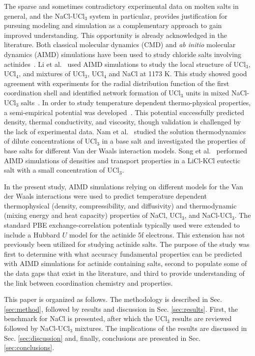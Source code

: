 \documentclass[preprint,3p,10pt,onecolumn,number,sort&compress]{elsarticle}
\begin{document}
The sparse and sometimes contradictory experimental data on molten salts in general, and the NaCl-UCl$_3$ system in particular, provides justification for pursuing modeling and simulation as a complementary approach to gain improved understanding. This opportunity is already acknowledged in the literature. Both classical molecular dynamics (CMD) and \textit{ab initio} molecular dynamics (AIMD) simulations have been used to study chloride salts involving actinides~\cite{Li,Li2020,Nam2015,SONG}. Li et al.~\cite{Li} used AIMD simulations to study the local structure of UCl$_3$, UCl$_4$, and mixtures of UCl$_3$, UCl$_4$ and NaCl at 1173 K. This study showed good agreement with experiments for the radial distribution function of the first coordination shell and identified network formation of UCl$_3$ units in mixed NaCl-UCl$_3$ salts~\cite{Li}. %
In order to study temperature dependent thermo-physical properties, a semi-empirical potential was developed~\cite{Li2020}. This potential successfully predicted density, thermal conductivity, and viscosity, though validation is challenged by the lack of experimental data. Nam et al.~\cite{Nam2015} studied the solution thermodynamics of dilute concentrations of UCl$_3$ in a base salt and investigated the properties of base salts for different Van der Waals interaction models. Song et al.~\cite{SONG} performed AIMD simulations of densities and transport properties in a LiCl-KCl eutectic salt with a small concentration of UCl$_3$. 

In the present study, AIMD simulations relying on different models for the Van der Waals interactions were used to predict temperature dependent thermophysical (density, compressibility, and diffusivity) and thermodynamic (mixing energy and heat capacity) properties of NaCl, UCl$_3$, and NaCl-UCl$_3$. The standard PBE exchange-correlation potentials typically used were extended to include a Hubbard $U$ model for the actinide 5f electrons. This extension has not previously been utilized for studying actinide salts. The purpose of the study was first to determine with what accuracy fundamental properties can be predicted with AIMD simulations for actinide containing salts, second to populate some of the data gaps that exist in the literature, and third to provide understanding of the link between coordination chemistry and properties. 

This paper is organized as follows. The methodology is described in Sec. \ref{sec:method}, followed by results and discussion in Sec. \ref{sec:results}. First, the benchmark for NaCl is presented, after which the UCl$_3$ results are reviewed followed by NaCl-UCl$_3$ mixtures. The implications of the results are discussed in Sec. \ref{sec:discussion} and, finally, conclusions are presented in Sec. \ref{sec:conclusions}. 
\end{document}

